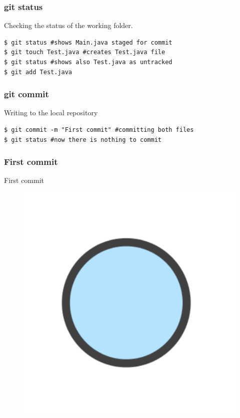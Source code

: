 \documentclass{beamer}
\begin{document}
\begin{frame}[fragile]
\frametitle{git status}

Checking the status of the working folder.

\begin{lstlisting}
$ git status #shows Main.java staged for commit
$ git touch Test.java #creates Test.java file
$ git status #shows also Test.java as untracked
$ git add Test.java
\end{lstlisting}
\end{frame}


\begin{frame}[fragile]
\frametitle{git commit}

Writing to the local repository

\begin{lstlisting}
$ git commit -m "First commit" #committing both files
$ git status #now there is nothing to commit
\end{lstlisting}
\end{frame}


\begin{frame}
\frametitle{First commit}
First commit
\begin{figure}
\includegraphics[scale=0.4]{figures/f8.png}
\end{figure}

\end{frame}
\end{document}
